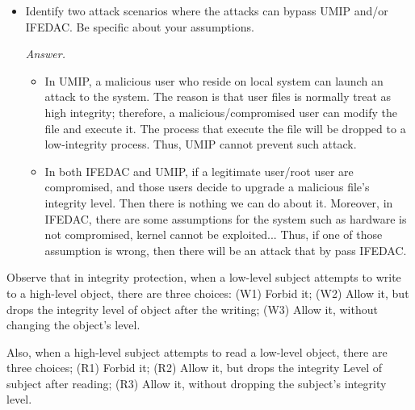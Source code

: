 \documentclass[11pt]{article}
\begin{document}
\begin{description}
{\begin{itemize}
\begin{mdframed}
\end{mdframed}
 \item
Identify two attack scenarios where the attacks can bypass UMIP and/or IFEDAC.  Be specific about your assumptions. 
\begin{mdframed}
	\textit{Answer. } 
	\begin{itemize}
		\item In UMIP, a malicious user who reside on local system can launch an attack to the system. The reason is that user files is normally treat as high integrity; therefore, a malicious/compromised user can modify the file and execute it. The process that execute the file will be dropped to a low-integrity process. Thus, UMIP cannot prevent such attack.
		\item In both IFEDAC and UMIP, if a legitimate user/root user are compromised, and those users decide to upgrade a malicious file's integrity level. Then there is nothing we can do about it. Moreover, in IFEDAC, there are some assumptions for the system such as hardware is not compromised, kernel cannot be exploited... Thus, if one of those assumption is wrong, then there will be an attack that by pass IFEDAC.
	\end{itemize}
\end{mdframed}
\end{itemize}
} 

Observe that in integrity protection, when a low-level subject attempts to write to a high-level object, there are three choices: (W1) Forbid it; (W2) Allow it, but drops the integrity level of object after the writing; (W3) Allow it, without changing the object's level.

Also, when a high-level subject attempts to read a low-level object, there are three choices; (R1) Forbid it; (R2) Allow it, but drops the integrity Level of subject after reading; (R3) Allow it, without dropping the subject's integrity level.


\end{description}
\end{document}
